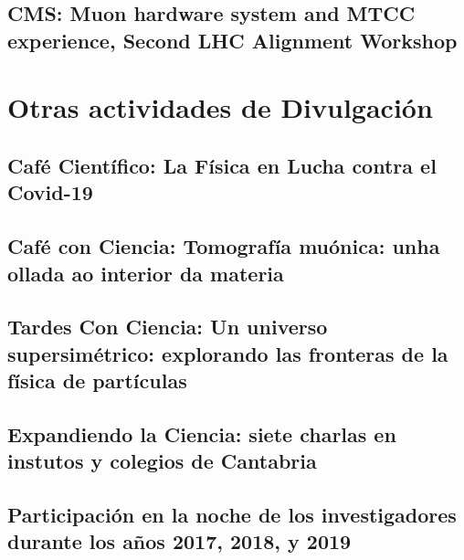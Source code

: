 \documentclass[a4paper, 11pt, twoside, openright]{report}
\begin{document}
\subsection{CMS: Muon hardware system and MTCC experience, Second LHC Alignment Workshop}



\section{Otras actividades de Divulgación}

\subsection{Café Científico: La Física en Lucha contra el Covid-19}


\subsection{Café con Ciencia: Tomografía muónica: unha ollada ao interior da materia}


\subsection{Tardes Con Ciencia: Un universo supersimétrico: explorando las fronteras de la física de partículas}


\subsection{Expandiendo la Ciencia: siete charlas en instutos y colegios de Cantabria}


\subsection{Participación en la noche de los investigadores durante los años 2017, 2018, y 2019}

\end{document}
